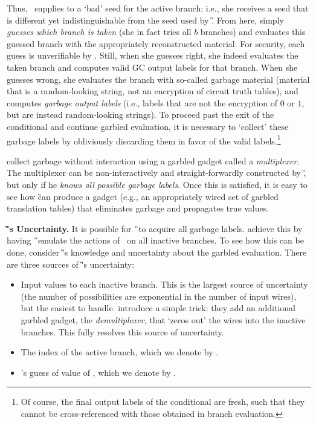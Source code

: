 Thus, \HK\ supplies to \E a `bad' seed for the active branch: i.e.,
she receives a seed that is different yet indistinguishable from the
seed used by \G.
From here, \E
simply \emph{guesses which branch is taken} (she in fact tries  all $b$
branches) and evaluates this guessed branch with the appropriately reconstructed material.
For security, each guess is unverifiable by \E. 
Still, when she guesses right, she indeed evaluates the taken branch and
computes valid GC output labels for that branch.
When she guesses wrong, she evaluates the branch
with so-called garbage material (material that is a random-looking string, not
an encryption of circuit truth tables), and computes
\emph{garbage output labels} (i.e., labels that are not the encryption
of $0$ or $1$, but are instead random-looking strings).
%
To proceed past the exit of the conditional and continue garbled evaluation, it is necessary to
`collect'  these garbage labels by obliviously  discarding them in favor of the valid
labels.\footnote{Of course, the final output labels of the conditional
  are fresh,  such that they cannot be cross-referenced with those
obtained in branch evaluation.}


\HK collect garbage without
interaction using a garbled gadget called a \emph{multiplexer}.
%
The multiplexer can be non-interactively and straight-forwardly constructed by \G,
but only if he \emph{knows all possible garbage labels}.
Once this is satisfied, it is easy to see how \G can produce a gadget
(e.g., an appropriately wired set of garbled translation tables)
that eliminates garbage and propagates true values.


{\bf \G's Uncertainty.}
It is possible for \G\ to acquire all garbage labels.
\HK achieve this by having \G\ emulate the actions of \E\
 on all inactive branches.
To see how this can be done,
 consider \G's knowledge and uncertainty about the garbled evaluation.
 There are three sources of \G's uncertainty:
\begin{itemize}
  \item Input values to each inactive branch.
    This is the largest source of uncertainty (the number of
    possibilities are exponential in the number of input wires), but
    the easiest to handle.  \HK introduce a simple trick:
    they add an additional garbled gadget, the \emph{demultiplexer},
    that `zeros out' the wires into the inactive branches.
    This fully resolves this source of uncertainty.
  \item The index of the active branch, which we denote by \truth.
  \item \E's guess of value of \truth, which we denote by \guess.
\end{itemize}

